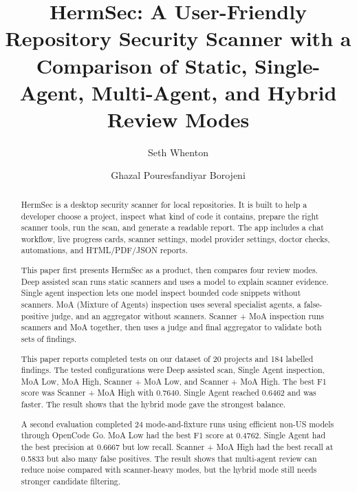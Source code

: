 \documentclass[sigconf,nonacm]{acmart}
\begin{document}
\title{HermSec: A User-Friendly Repository Security Scanner with a Comparison of Static, Single-Agent, Multi-Agent, and Hybrid Review Modes}

\author{Seth Whenton}
\email{}

\author{Ghazal Pouresfandiyar Borojeni}
\email{}

\begin{abstract}
HermSec is a desktop security scanner for local repositories. It is built to help a developer choose a project, inspect what kind of code it contains, prepare the right scanner tools, run the scan, and generate a readable report. The app includes a chat workflow, live progress cards, scanner settings, model provider settings, doctor checks, automations, and HTML/PDF/JSON reports.

This paper first presents HermSec as a product, then compares four review modes. Deep assisted scan runs static scanners and uses a model to explain scanner evidence. Single agent inspection lets one model inspect bounded code snippets without scanners. MoA (Mixture of Agents) inspection uses several specialist agents, a false-positive judge, and an aggregator without scanners. Scanner + MoA inspection runs scanners and MoA together, then uses a judge and final aggregator to validate both sets of findings.

This paper reports completed tests on our dataset of 20 projects and 184 labelled findings. The tested configurations were Deep assisted scan, Single Agent inspection, MoA Low, MoA High, Scanner + MoA Low, and Scanner + MoA High. The best F1 score was Scanner + MoA High with 0.7640. Single Agent reached 0.6462 and was faster. The result shows that the hybrid mode gave the strongest balance.

A second evaluation completed 24 mode-and-fixture runs using efficient non-US models through OpenCode Go. MoA Low had the best F1 score at 0.4762. Single Agent had the best precision at 0.6667 but low recall. Scanner + MoA High had the best recall at 0.5833 but also many false positives. The result shows that multi-agent review can reduce noise compared with scanner-heavy modes, but the hybrid mode still needs stronger candidate filtering.
\end{abstract}

\end{document}
